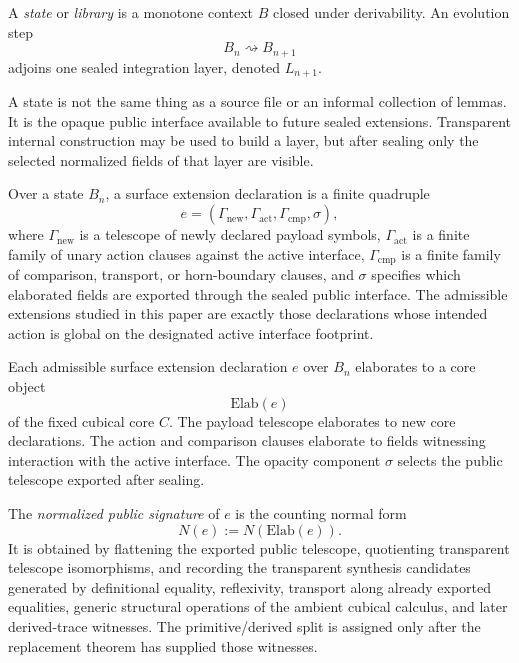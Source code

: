 \documentclass{lmcs}
\begin{document}
\begin{defi}[State]
A \emph{state} or \emph{library} is a monotone context \(B\) closed under derivability.  An
evolution step
\[
  B_n \rightsquigarrow B_{n+1}
\]
adjoins one sealed integration layer, denoted \(L_{n+1}\).
\end{defi}

A state is not the same thing as a source file or an informal collection of lemmas.  It is the
opaque public interface available to future sealed extensions.  Transparent internal
construction may be used to build a layer, but after sealing only the selected normalized
fields of that layer are visible.

\begin{defi}
Over a state \(B_n\), a surface extension declaration is a finite quadruple
\[
  e=(\Gamma_{\mathrm{new}},\Gamma_{\mathrm{act}},\Gamma_{\mathrm{cmp}},\sigma),
\]
where \(\Gamma_{\mathrm{new}}\) is a telescope of newly declared payload symbols,
\(\Gamma_{\mathrm{act}}\) is a finite family of unary action clauses against the active
interface, \(\Gamma_{\mathrm{cmp}}\) is a finite family of comparison, transport, or
horn-boundary clauses, and \(\sigma\) specifies which elaborated fields are exported through
the sealed public interface.  The admissible extensions studied in this paper are exactly
those declarations whose intended action is global on the designated active interface
footprint.
\end{defi}

\begin{defi}
Each admissible surface extension declaration \(e\) over \(B_n\) elaborates to a core object
\[
  \mathrm{Elab}(e)
\]
of the fixed cubical core \(C\).  The payload telescope elaborates to new core declarations.
The action and comparison clauses elaborate to fields witnessing interaction with the active
interface.  The opacity component \(\sigma\) selects the public telescope exported after
sealing.

The \emph{normalized public signature} of \(e\) is the counting normal form
\[
  N(e) := N(\mathrm{Elab}(e)).
\]
It is obtained by flattening the exported public telescope, quotienting transparent telescope
isomorphisms, and recording the transparent synthesis candidates generated by definitional
equality, reflexivity, transport along already exported equalities, generic structural
operations of the ambient cubical calculus, and later derived-trace witnesses.  The
primitive/derived split is assigned only after the replacement theorem has supplied those
witnesses.
\end{defi}
\end{document}
